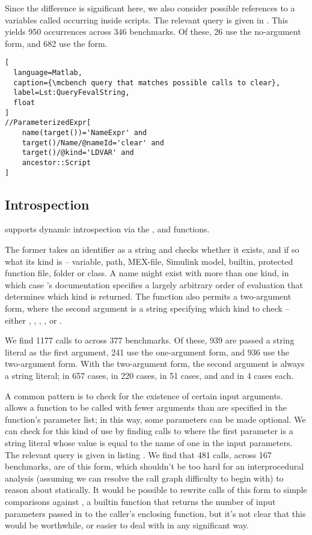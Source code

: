 Since the difference is significant here, we also consider possible references
to a variables called  occurring inside scripts. The relevant query
is given in . This yields 950 occurrences across
346 benchmarks. Of these, 26 use the no-argument form, and 682 use the
 form.

\begin{lstlisting}[
  language=Matlab,
  caption={\mcbench query that matches possible calls to clear},
  label=Lst:QueryFevalString,
  float
]
//ParameterizedExpr[
    name(target())='NameExpr' and
    target()/Name/@nameId='clear' and
    target()/@kind='LDVAR' and
    ancestor::Script
]
\end{lstlisting}

\subsection{Introspection}

\matlab supports dynamic introspection via the ,  and
 functions.

The former takes an identifier as a string and checks whether it exists, and if
so what its kind is -- variable, path, MEX-file, Simulink model, builtin,
protected function file, folder or class. A name might exist with more than one
kind, in which case \matlab's documentation specifies a largely arbitrary order
of evaluation that determines which kind is returned. The function also permits
a two-argument form, where the second argument is a string specifying which
kind to check -- either , , ,
, or .

We find 1177 calls to  across 377 benchmarks. Of these, 939 are
passed a string literal as the first argument, 241 use the one-argument form,
and 936 use the two-argument form. With the two-argument form, the second
argument is always a string literal;  in 657 cases, 
in 220 cases,  in 51 cases, and  and 
in 4 cases each.

A common pattern is to check for the existence of certain input arguments.
\matlab allows a function to be called with fewer arguments than are specified
in the function's parameter list; in this way, some parameters can be made
optional. We can check for this kind of use by finding calls to 
where the first parameter is a string literal whose value is equal to the name
of one in the input parameters. The relevant query is given in listing
. We find that 481 calls, across 167 benchmarks,
are of this form, which shouldn't be too hard for an interprocedural analysis
(assuming we can resolve the call graph difficulty to begin with) to reason
about statically. It would be possible to rewrite calls of this form to simple
comparisons against , a builtin \matlab function that returns the
number of input parameters passed in to the caller's enclosing function, but
it's not clear that this would be worthwhile, or easier to deal with in any
significant way.

